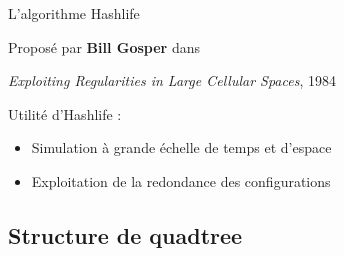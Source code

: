 \documentclass{beamer}
\begin{document}
\begin{frame}{L'algorithme Hashlife}
  
  \begin{center}
    Proposé par \textbf{Bill Gosper} dans

    \textit{Exploiting Regularities in Large Cellular Spaces}, 1984

  \end{center}

  \medskip

  Utilité d'Hashlife :
  \begin{itemize}
    \item Simulation à grande échelle de temps et d'espace
    \item Exploitation de la redondance des configurations
  \end{itemize}

\end{frame}

\subsection{Structure de quadtree}
\end{document}
